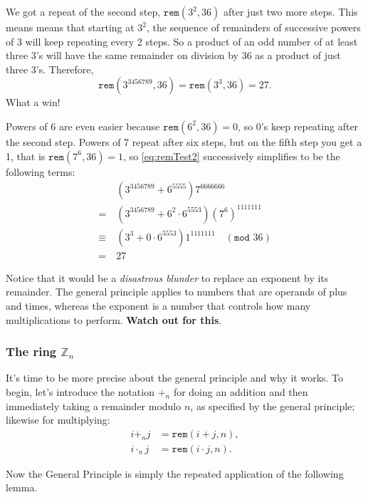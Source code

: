 \documentclass[11pt,oneside]{book}
\theoremstyle{definition}
\begin{document}
We got a repeat of the second step, $\texttt{rem}(3^{2}, 36)$ after just two more steps.
This means means that starting at $3^{2}$, the sequence of remainders of successive powers of 3 will keep repeating every 2 steps.
So a product of an odd number of at least three 3's will have the same remainder on division by 36 as a product of just three 3's. Therefore,
\[ \texttt{rem}(3^{3456789}, 36) = \texttt{rem}(3^{3}, 36) = 27. \]
What a win!

Powers of 6 are even easier because $\texttt{rem}(6^{2}, 36) = 0$, so 0's keep repeating after the second step.
Powers of 7 repeat after six steps, but on the fifth step you get a 1, that is $\texttt{rem}(7^{6}, 36) = 1$, so \eqref{eq:remTest2} successively simplifies to be the following terms:
\begin{align*}
    &\ (3^{3456789} + 6^{5555})7^{6666666} \\
    =&\ (3^{3456789} + 6^{2} \cdot 6^{5553})(7^{6})^{1111111} \\
    \equiv&\ (3^{3} + 0 \cdot 6^{5553})1^{1111111}\quad (\texttt{mod } 36) \\
    =&\ 27
\end{align*}

Notice that it would be a \emph{disastrous blunder} to replace an exponent by its remainder.
The general principle applies to numbers that are operands of plus and times, whereas the exponent is a number that controls how many multiplications to perform.
\textbf{Watch out for this}.


\subsubsection{The ring $\mathbb{Z}_{n}$}
It's time to be more precise about the general principle and why it works.
To begin, let's introduce the notation $+_{n}$ for doing an addition and then immediately taking a remainder modulo $n$, as specified by the general principle; likewise for multiplying:
\begin{align*}
    i +_{n} j &= \texttt{rem}(i + j, n), \\
    i \cdot_{n} j &= \texttt{rem}(i \cdot j, n).
\end{align*}

Now the General Principle is simply the repeated application of the following lemma.
\end{document}
